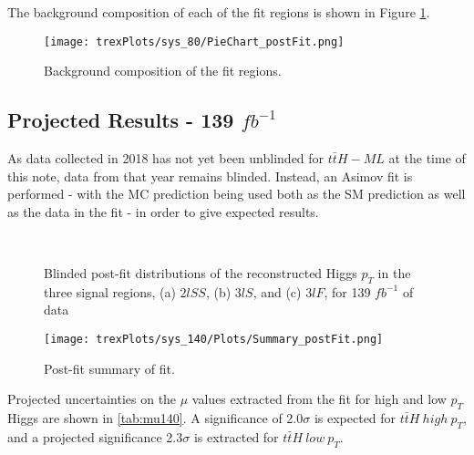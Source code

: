 The background composition of each of the fit regions is shown in Figure \ref{fig:pieChart80}.

\begin{figure}[H]
    \centering
    \texttt{[image: trexPlots/sys\_80/PieChart\_postFit.png]}
    \caption{Background composition of the fit regions.}
    \label{fig:pieChart80}
\end{figure} 


\subsection{Projected Results - 139 $fb^{-1}$}   
\label{sec:res140}

As data collected in 2018 has not yet been unblinded for $t\bar{t}H-ML$ at the time of this note, data from that year remains blinded. Instead, an Asimov fit is performed - with the MC prediction being used both as the SM prediction as well as the data in the fit - in order to give expected results.

\begin{figure}[H]
    \centering
    \\
    \caption{Blinded post-fit distributions of the reconstructed Higgs $p_T$ in the three signal regions, (a) $2lSS$, (b) $3lS$, and (c) $3lF$, for 139 $fb^{-1}$ of data}
    \label{fig:sigRegions140}
\end{figure}

\begin{figure}[H]
    \center
    \texttt{[image: trexPlots/sys\_140/Plots/Summary\_postFit.png]}
    \caption{Post-fit summary of fit.}
    \label{fig:Summary140}
\end{figure}

Projected uncertainties on the $\mu$ values extracted from the fit for high and low $p_T$ Higgs are shown in \ref{tab:mu140}. A significance of 2.0$\sigma$ is expected for $t\bar{t}H\ high\ p_T$, and a projected significance 2.3$\sigma$ is extracted for $t\bar{t}H\ low\ p_T$.

